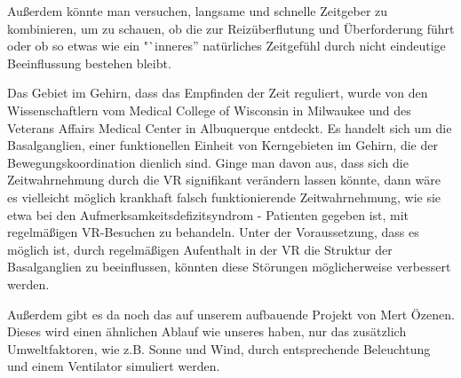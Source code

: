 \documentclass{Bericht}
\begin{document}
Außerdem könnte man versuchen, langsame und schnelle Zeitgeber zu  kombinieren, um zu schauen, ob die zur Reizüberflutung und Überforderung führt oder ob so etwas wie ein "`inneres'' natürliches Zeitgefühl durch nicht eindeutige Beeinflussung bestehen bleibt.

Das Gebiet im Gehirn, dass das Empfinden der Zeit reguliert, wurde von den Wissenschaftlern vom Medical College of Wisconsin in Milwaukee und des Veterans Affairs Medical Center in Albuquerque entdeckt. Es handelt sich um die Basalganglien, einer funktionellen Einheit von Kerngebieten im Gehirn, die der Bewegungskoordination dienlich sind. Ginge man davon aus, dass sich die Zeitwahrnehmung durch die VR signifikant verändern lassen könnte, dann wäre es vielleicht möglich krankhaft falsch funktionierende Zeitwahrnehmung, wie sie etwa bei den Aufmerksamkeitsdefizitsyndrom - Patienten gegeben ist, mit regelmäßigen VR-Besuchen zu behandeln. Unter der Voraussetzung, dass es  möglich ist, durch regelmäßigen Aufenthalt in der VR die Struktur der Basalganglien zu beeinflussen, könnten diese Störungen möglicherweise verbessert werden.

Außerdem gibt es da noch das auf unserem aufbauende Projekt von Mert Özenen. Dieses wird einen ähnlichen Ablauf wie unseres haben, nur das zusätzlich Umweltfaktoren, wie z.B. Sonne und Wind, durch entsprechende Beleuchtung und einem Ventilator simuliert werden.



\end{document}
